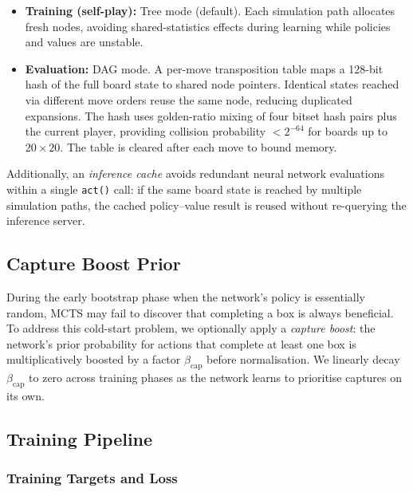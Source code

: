\documentclass[11pt]{article}
\begin{document}
\begin{itemize}
  \item \textbf{Training (self-play):} Tree mode (default). Each
    simulation path allocates fresh nodes, avoiding shared-statistics
    effects during learning while policies and values are unstable.
  \item \textbf{Evaluation:} DAG mode. A per-move transposition table
    maps a 128-bit hash of the full board state to shared node pointers.
    Identical states reached via different move orders reuse the same
    node, reducing duplicated expansions. The hash uses golden-ratio
    mixing of four bitset hash pairs plus the current player, providing
    collision probability $< 2^{-64}$ for boards up to $20{\times}20$.
    The table is cleared after each move to bound memory.
\end{itemize}

Additionally, an \emph{inference cache} avoids redundant neural network
evaluations within a single \texttt{act()} call: if the same board state
is reached by multiple simulation paths, the cached policy--value result
is reused without re-querying the inference server.

\subsection{Capture Boost Prior}
\label{sec:captureboost}

During the early bootstrap phase when the network's policy is essentially
random, MCTS may fail to discover that completing a box is always
beneficial. To address this cold-start problem, we optionally apply a
\emph{capture boost}: the network's prior probability for actions that
complete at least one box is multiplicatively boosted by a factor
$\beta_{\text{cap}}$ before normalisation. We linearly decay
$\beta_{\text{cap}}$ to zero across training phases as the network
learns to prioritise captures on its own.

\subsection{Training Pipeline}
\label{sec:selfplay}

\subsubsection{Training Targets and Loss}
\label{sec:loss}
\end{document}
